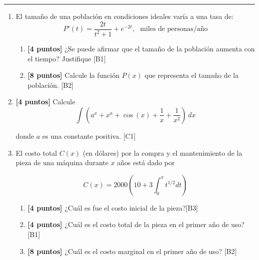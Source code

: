 \documentclass[10pt]{exam}
\begin{document}
\addpoints

\noindent
\rule[2ex]{\textwidth}{2pt}


\begin{enumerate}
\normalsize
\setlength{\columnsep}{10mm}


   \item El tamaño de una población en condiciones ideales varía a una tasa de: $$P'(t)=\frac{2t}{t^2+1}+e^{-2t},\,\,\,\,\text{miles de personas/año}$$
 \begin{enumerate}

    \item \textbf{[4 puntos]} ¿Se puede afirmar que el tamaño de la población aumenta con el tiempo? Justifique \hfill{[B1]}
     \item \textbf{[8 puntos]} Calcule la funci\'on $P(x)$ que representa el tamaño de la poblaci\'on. \hfill{[B2]}
 \end{enumerate}


   \item \textbf{[4 puntos]} Calcule $$\int \left(a^x +x^a + \cos(x)+\dfrac{1}{x}+\dfrac{1}{x^2}\right)\, dx$$ 

donde $a$ es una constante positiva. \hfill{[C1]} 


\item El costo total $C(x)$ (en dólares) por la compra y el mantenimiento de la pieza de una máquina durante $x$ años está dado por

\[C(x)=2000\left(10+3\int_0^x t^{1/2} dt\right)\]


\begin{enumerate}
    \item  \textbf{[4 puntos]} ¿Cuál es fue el costo inicial de la pieza?\hfill{[B3]}
    \item  \textbf{[4 puntos]} ¿Cuál es el costo total de la pieza en el primer año de uso?\hfill{[B1]}
    \item \textbf{[8 puntos]} ¿Cuál es el costo marginal en el primer año de uso? \hfill{[B2]}




\end{enumerate}
\end{enumerate}
\end{document}

